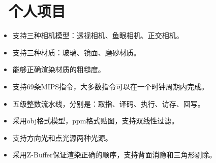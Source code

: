 \documentclass{resume}
\begin{document}
\section{\texorpdfstring{\faGithubAlt\ 个人项目}{个人项目}}
\begin{itemize}
  \item 支持三种相机模型：透视相机、鱼眼相机、正交相机。
  \item 支持三种材质：玻璃、镜面、磨砂材质。
  \item 能够正确渲染材质的粗糙度。
\end{itemize}

\begin{itemize}
  \item 支持69条MIPS指令，大多数指令可以在一个时钟周期内完成。
  \item 五级整数流水线，分别是：取指、译码、执行、访存、回写。
\end{itemize}


\begin{itemize}
  \item 采用obj格式模型，ppm格式贴图，支持双线性过滤。
  \item 支持方向光和点光源两种光源。
  \item 采用Z-Buffer保证渲染正确的顺序，支持背面消隐和三角形剔除。
\end{itemize}

\end{document}
